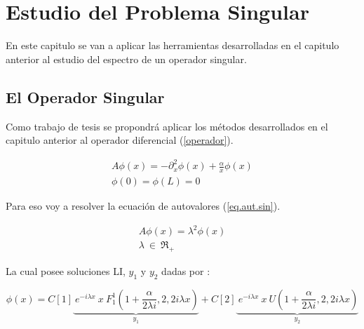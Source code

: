 \chapter{Estudio del Problema Singular}

En este capitulo se van a aplicar las herramientas desarrolladas en el capitulo anterior al estudio del espectro de un operador singular.

\section{El Operador Singular}

Como trabajo de tesis se propondrá aplicar los métodos desarrollados en el capitulo anterior al operador diferencial (\ref{operador}).

\begin{equation}
\begin{array}{c}
    A \phi (x) = - \partial ^2 _x  \phi(x) + \frac{\alpha}{x} \phi(x) \\
    \phi(0) = \phi(L) = 0 
\end{array}
\label{operador}
\end{equation}

Para eso voy a resolver la ecuación de autovalores (\ref{eq.aut.sin}).

\begin{equation}
\begin{array}{c}
    A  \phi (x)  =   \lambda ^2 \phi (x) \\ 
    \lambda \ \in \ \mathfrak{R} _+
\end{array}
\label{eq.aut.sin}
\end{equation}




La cual posee soluciones LI, $ y_1 $ y $ y_2 $ dadas por :

\begin{equation}
    \phi (x) = 
    C[1]
    \underbrace{
     \ e ^{-i \lambda x} \ x \ F _{1} ^{1} (1+\frac{ \alpha}{2 \lambda i },2,2 i \lambda x) } _ {y_1}
    + C[2] \underbrace{ \ e^{-i \lambda x } \ x \ U (1+\frac{ \alpha}{2 \lambda i },2,2 i \lambda x) } _{y_2} 
\end{equation}




